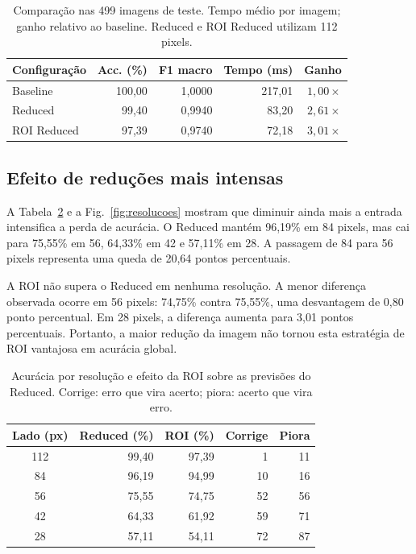 \documentclass[conference]{IEEEtran}
\begin{document}
\begin{table}[t]
\caption{Comparação nas 499 imagens de teste. Tempo médio por imagem;
ganho relativo ao baseline. Reduced e ROI Reduced utilizam 112 pixels.}
\label{tab:principal}
\centering
\footnotesize
\setlength{\tabcolsep}{4pt}
\begin{tabular}{lrrrr}
\toprule
Configuração & Acc. (\%) & F1 macro & Tempo (ms) & Ganho \\
\midrule
Baseline    & 100,00 & 1,0000 & 217,01 & $1{,}00\times$ \\
Reduced     & 99,40  & 0,9940 & 83,20  & $2{,}61\times$ \\
ROI Reduced & 97,39  & 0,9740 & 72,18  & $3{,}01\times$ \\
\bottomrule
\end{tabular}
\end{table}

\subsection{Efeito de reduções mais intensas}
A Tabela~\ref{tab:resolucoes} e a Fig.~\ref{fig:resolucoes} mostram
que diminuir ainda mais a entrada intensifica a perda de acurácia.
O Reduced mantém 96,19\% em 84 pixels, mas cai para 75,55\% em 56,
64,33\% em 42 e 57,11\% em 28. A passagem de 84 para 56 pixels
representa uma queda de 20,64 pontos percentuais.

A ROI não supera o Reduced em nenhuma resolução. A menor diferença
observada ocorre em 56 pixels: 74,75\% contra 75,55\%, uma desvantagem
de 0,80 ponto percentual. Em 28 pixels, a diferença aumenta para
3,01 pontos percentuais. Portanto, a maior redução da imagem não
tornou esta estratégia de ROI vantajosa em acurácia global.

\begin{table}[t]
\caption{Acurácia por resolução e efeito da ROI sobre as previsões do
Reduced. Corrige: erro que vira acerto; piora: acerto que vira erro.}
\label{tab:resolucoes}
\centering
\footnotesize
\setlength{\tabcolsep}{4pt}
\begin{tabular}{crrrr}
\toprule
Lado (px) & Reduced (\%) & ROI (\%) & Corrige & Piora \\
\midrule
112 & 99,40 & 97,39 & 1  & 11 \\
84  & 96,19 & 94,99 & 10 & 16 \\
56  & 75,55 & 74,75 & 52 & 56 \\
42  & 64,33 & 61,92 & 59 & 71 \\
28  & 57,11 & 54,11 & 72 & 87 \\
\bottomrule
\end{tabular}
\end{table}
\end{document}
